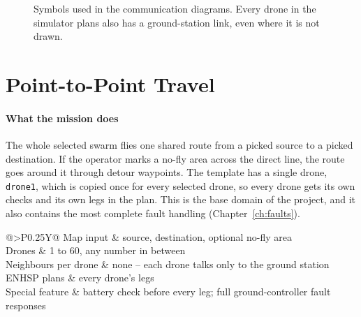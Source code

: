 \documentclass[11pt,a4paper,oneside]{report}
\makeatletter
\newcommand{\maxTravel}{60}
\newcommand{\code}[1]{\texttt{#1}}
\newcommand{\glancebox}[2]{%
  \begin{tcolorbox}[enhanced,colback=softblue!45,colframe=navy,coltitle=white,
      fonttitle=\bfseries\small,title={#1},boxrule=0.6pt,arc=2pt,
      left=6pt,right=6pt,top=3pt,bottom=3pt,before skip=8pt,after skip=10pt]
    \small\setstretch{1.1}%
    \begin{tabularx}{\linewidth}{@{}>{\bfseries}P{0.25\linewidth}Y@{}}#2\end{tabularx}
  \end{tcolorbox}}
\makeatother
\begin{document}
\begin{figure}[H]
\centering
{}
\caption[Symbols used in the communication diagrams]{Symbols used in the communication diagrams.
Every drone in the simulator plans also has a ground-station link, even where it is not drawn.}
\label{fig:legend}
\end{figure}

\section{Point-to-Point Travel}\label{sec:plan-travel}
\paragraph{What the mission does}
The whole selected swarm flies one shared route from a picked source to a picked destination.
If the operator marks a no-fly area across the direct line, the route goes around it through
detour waypoints. The template has a single drone, \code{drone1}, which is copied once for every
selected drone, so every drone gets its own checks and its own legs in the plan. This is the base
domain of the project, and it also contains the most complete fault handling
(Chapter~\ref{ch:faults}).

\glancebox{At a glance: point-to-point travel}{
Map input & source, destination, optional no-fly area \\
Drones & 1 to \maxTravel{}, any number in between \\
Neighbours per drone & none -- each drone talks only to the ground station \\
ENHSP plans & every drone's legs \\
Special feature & battery check before every leg; full ground-controller fault responses \\}
\end{document}
